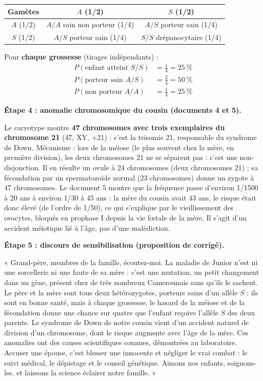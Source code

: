 \documentclass[11pt]{article}
\newcommand{\cle}[1]{{\popxbold\color{popdark}#1}}
\begin{document}
\begin{exoresolu}
\begin{center}
\begin{tabular}{|c|c|c|}
\hline
\rowcolor{popblueL} \textbf{Gamètes} & $A$ (1/2) & $S$ (1/2) \\
\hline
$A$ (1/2) & $A/A$ sain non porteur (1/4) & $A/S$ porteur sain (1/4) \\
\hline
$S$ (1/2) & $A/S$ porteur sain (1/4) & $S/S$ drépanocytaire (1/4) \\
\hline
\end{tabular}
\end{center}

Pour \textbf{chaque grossesse} (tirages indépendants) :
\begin{align*}
P(\text{enfant atteint } S/S) &= \tfrac{1}{4} = 25\ \% \\
P(\text{porteur sain } A/S) &= \tfrac{2}{4} = 50\ \% \\
P(\text{non porteur } A/A) &= \tfrac{1}{4} = 25\ \%
\end{align*}

\textbf{Étape 4 : anomalie chromosomique du cousin (documents 4 et 5).}

Le caryotype montre \textbf{47 chromosomes avec trois exemplaires du chromosome 21} (47, XY, +21) : c'est la \cle{trisomie 21}, responsable du \cle{syndrome de Down}. Mécanisme : lors de la méiose (le plus souvent chez la mère, en première division), les deux chromosomes 21 ne se séparent pas : c'est une \cle{non-disjonction}. Il en résulte un ovule à 24 chromosomes (deux chromosomes 21) ; sa fécondation par un spermatozoïde normal (23 chromosomes) donne un zygote à 47 chromosomes. Le document 5 montre que la fréquence passe d'environ 1/1500 à 20 ans à environ 1/30 à 45 ans : la mère du cousin avait 43 ans, le risque était donc élevé (de l'ordre de 1/50), ce qui s'explique par le vieillissement des ovocytes, bloqués en prophase I depuis la vie fœtale de la mère. Il s'agit d'un accident méiotique lié à l'âge, pas d'une malédiction.

\textbf{Étape 5 : discours de sensibilisation (proposition de corrigé).}

« Grand-père, membres de la famille, écoutez-moi. La maladie de Junior n'est ni une sorcellerie ni une faute de sa mère : c'est une \cle{mutation}, un petit changement dans un gène, présent chez de très nombreux Camerounais sans qu'ils le sachent. Le père et la mère sont tous deux \cle{hétérozygotes}, porteurs sains d'un \cle{allèle} $S$ : ils sont en bonne santé, mais à chaque grossesse, le \cle{hasard} de la \cle{méiose} et de la fécondation donne une chance sur quatre que l'enfant reçoive l'allèle $S$ des deux parents. Le syndrome de Down de notre cousin vient d'un accident naturel de division d'un \cle{chromosome}, dont le risque augmente avec l'âge de la mère. Ces anomalies ont des causes scientifiques connues, démontrées au laboratoire. Accuser une épouse, c'est blesser une innocente et négliger le vrai combat : le suivi médical, le dépistage et le conseil génétique. Aimons nos enfants, soignons-les, et laissons la science éclairer notre famille. »
\end{exoresolu}
\end{document}
